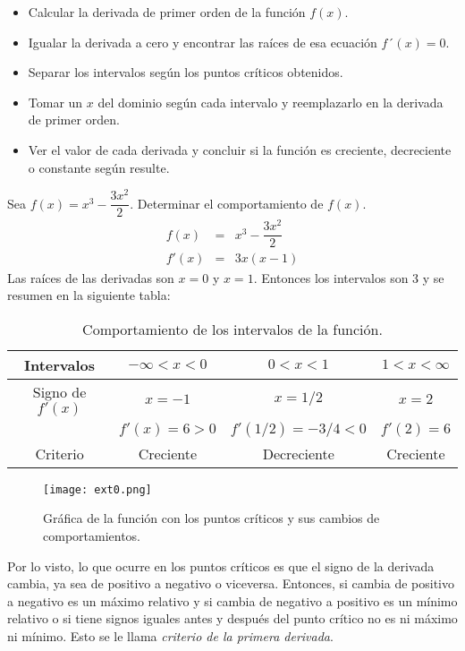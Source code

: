 \begin{itemize}
	\item Calcular la derivada de primer orden de la función $f(x)$.
	\item Igualar la derivada a cero y encontrar las raíces de esa ecuación $f´(x)=0$.
	\item Separar los intervalos según los puntos críticos obtenidos.
	\item Tomar un $x$ del dominio según cada intervalo y reemplazarlo en la derivada de primer orden.
	\item Ver el valor de cada derivada y concluir si la función es creciente, decreciente o constante según resulte.
\end{itemize}

\begin{myexample}
Sea $f(x)=x^{3}-\dfrac{3x^{2}}{2}$. Determinar el comportamiento de $f(x)$.
\begin{eqnarray*}
f(x)&=& x^{3}-\dfrac{3x^{2}}{2}\\
f'(x)&=&3x(x-1)
\end{eqnarray*}
Las raíces de las derivadas son $x=0$ y $x=1$. Entonces los intervalos son 3 y se resumen en la siguiente tabla:
\begin{table}[h!]
\begin{center}
		\begin{tabular}{|c|c|c|c|}
		\hline
		Intervalos & $-\infty <x<0$   & $0<x<1$&$1<x<\infty$ \\ 
		\hline
		 Signo de $f'(x)$&$x=-1$ &$x=1/2$ &$x=2$   \\
		 & $f'(x)=6>0$  & $f'(1/2)=-3/4<0$&$f'(2)=6$  \\
		\hline
		Criterio &Creciente&Decreciente& Creciente \\
		\hline
		\end{tabular}
		\caption{Comportamiento de los intervalos de la función.}
\end{center}
\end{table}
 \begin{center}
\begin{figure}[h!]
\centering
\texttt{[image: ext0.png]}
\caption{Gráfica de la función con los puntos críticos y sus cambios de comportamientos.} \label{ext0}
\end{figure}
\end{center}
\end{myexample}

Por lo visto, lo que ocurre en los puntos críticos es que el signo de la derivada cambia, ya sea de positivo a negativo  o viceversa. Entonces, si cambia de positivo a negativo es un máximo relativo y si cambia de negativo a positivo es un mínimo relativo o si tiene signos iguales antes y después del punto crítico no es ni máximo ni mínimo. Esto se le llama \textit{criterio de la primera derivada}.

